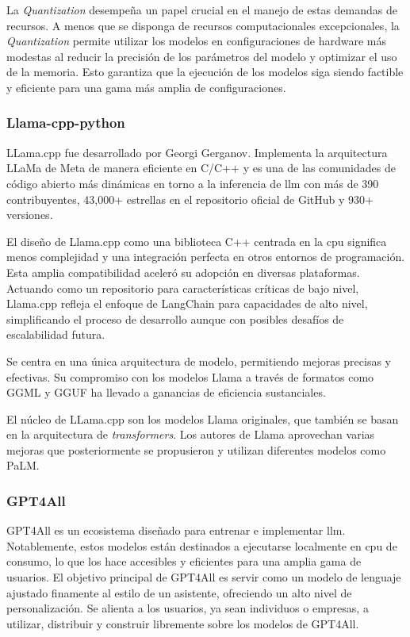 
La \textit{Quantization} desempeña un papel crucial en el manejo de estas demandas de recursos. A menos que se disponga de recursos computacionales excepcionales, la \textit{Quantization} permite utilizar los modelos en configuraciones de hardware más modestas al reducir la precisión de los parámetros del modelo y optimizar el uso de la memoria. Esto garantiza que la ejecución de los modelos siga siendo factible y eficiente para una gama más amplia de configuraciones.

\subsubsection{Llama-cpp-python}

LLama.cpp fue desarrollado por Georgi Gerganov. Implementa la arquitectura LLaMa de Meta de manera eficiente en C/C++ y es una de las comunidades de código abierto más dinámicas en torno a la inferencia de \acrlong{llm} con más de 390 contribuyentes, 43,000+ estrellas en el repositorio oficial de GitHub y 930+ versiones\cite{llama.cpp}.

El diseño de Llama.cpp como una biblioteca C++ centrada en la \acrshort{cpu} significa menos complejidad y una integración perfecta en otros entornos de programación. Esta amplia compatibilidad aceleró su adopción en diversas plataformas. Actuando como un repositorio para características críticas de bajo nivel, Llama.cpp refleja el enfoque de LangChain para capacidades de alto nivel, simplificando el proceso de desarrollo aunque con posibles desafíos de escalabilidad futura.

Se centra en una única arquitectura de modelo, permitiendo mejoras precisas y efectivas. Su compromiso con los modelos Llama a través de formatos como GGML y GGUF ha llevado a ganancias de eficiencia sustanciales.

El núcleo de LLama.cpp son los modelos Llama originales, que también se basan en la arquitectura de \textit{transformers}. Los autores de Llama aprovechan varias mejoras que posteriormente se propusieron y utilizan diferentes modelos como PaLM.

\subsubsection{GPT4All}

GPT4All es un ecosistema diseñado para entrenar e implementar \acrlong{llm}. Notablemente, estos modelos están destinados a ejecutarse localmente en \acrshort{cpu} de consumo, lo que los hace accesibles y eficientes para una amplia gama de usuarios. El objetivo principal de GPT4All es servir como un modelo de lenguaje ajustado finamente al estilo de un asistente, ofreciendo un alto nivel de personalización. Se alienta a los usuarios, ya sean individuos o empresas, a utilizar, distribuir y construir libremente sobre los modelos de GPT4All\cite{gpt4all}.

